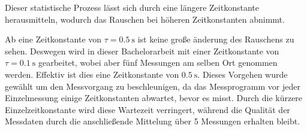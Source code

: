 Dieser statistische Prozess lässt sich durch eine längere 
Zeitkonstante herausmitteln, wodurch das Rauschen bei höheren 
Zeitkonstanten abnimmt.




Ab eine Zeitkonstante von $\tau=\SI{0.5}{\second}$ ist keine große änderung des Rauschens zu sehen. 
Deswegen wird in dieser Bachelorarbeit mit einer Zeitkonstante von 
$\tau=\SI{0.1}{\second}$ gearbeitet, 
wobei aber fünf Messungen am selben Ort genommen 
werden. Effektiv ist dies eine Zeitkonstante von 
$\SI{0.5}{\second}$. 
Dieses Vorgehen wurde gewählt um den Messvorgang zu beschleunigen, 
da das Messprogramm vor jeder Einzelmessung einige Zeitkonstanten abwartet, 
bevor es misst. 
Durch die kürzere Einzelzeitkonstante wird diese Wartezeit verringert, 
während die 
Qualität der Messdaten durch die anschließende Mittelung über 5 
Messungen erhalten bleibt. 




